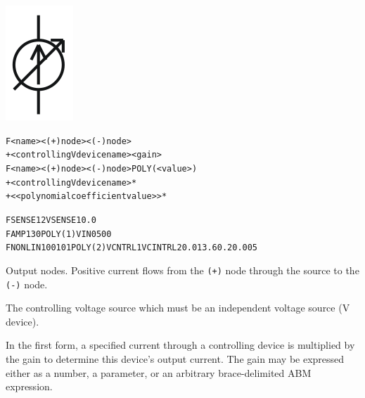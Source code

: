 


\begin{Device}

\symbol
{\includegraphics{cccsSymbol}}

\device
\begin{alltt}
F<name> <(+) node> <(-) node>
+ <controlling V device name> <gain>
F<name> <(+) node> <(-) node> POLY(<value>)
+ <controlling V device name>*
+ < <polynomial coefficient value> >*
\end{alltt}

\examples
\begin{alltt}
FSENSE 1 2 VSENSE 10.0
FAMP 13 0 POLY(1) VIN 0 500
FNONLIN 100 101 POLY(2) VCNTRL1 VCINTRL2 0.0 13.6 0.2 0.005
\end{alltt}

\parameters

\begin{Parameters}

Output nodes. Positive current flows from the \texttt{(+)} node through
the source to the \texttt{(-)} node.

The controlling voltage source which must be an independent voltage source
(V device).

\end{Parameters}

\comments

In the first form, a specified current through a controlling device is
multiplied by the gain to determine this device's output current.  The
gain may be expressed either as a number, a parameter, or an arbitrary
brace-delimited ABM expression.


\end{Device}
